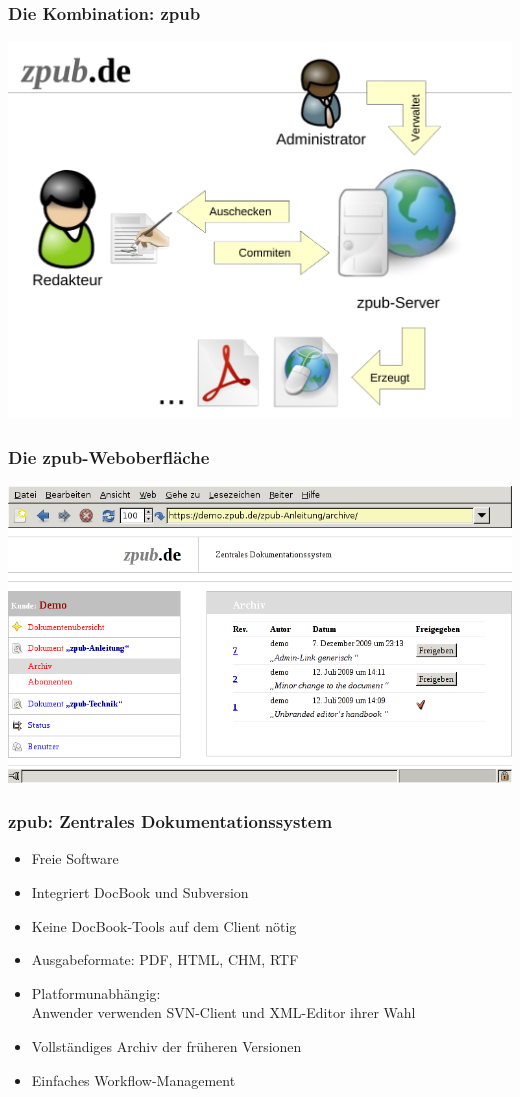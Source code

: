 \documentclass{beamer}
\begin{document}
\begin{frame}
\frametitle{Die Kombination: zpub}
\begin{center}
\includegraphics[height=.8\textheight]{zpub-struktur}
\end{center}
\end{frame}


\begin{frame}
\frametitle{Die zpub-Weboberfläche}
\begin{center}
\includegraphics[width=.75878906\paperwidth]{zpub-screenshot}
\end{center}
\end{frame}

\begin{frame}
\frametitle{zpub: Zentrales Dokumentationssystem}
\begin{itemize}
\item Freie Software
\item Integriert DocBook und Subversion
\item Keine DocBook-Tools auf dem Client nötig
\item Ausgabeformate: PDF, HTML, CHM, RTF
\item Platformunabhängig:\\ Anwender verwenden SVN-Client und XML-Editor ihrer Wahl
\item Vollständiges Archiv der früheren Versionen
\item Einfaches Workflow-Management
\end{itemize}
\end{frame}
\end{document}
